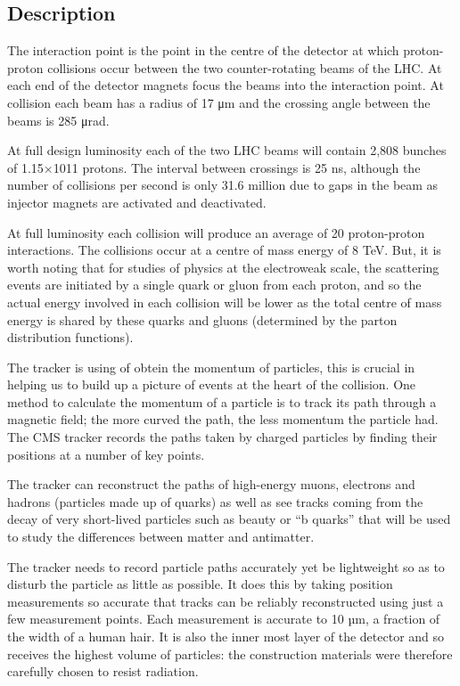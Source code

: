 \subsection{Description}

The interaction point is the point in the centre of the detector at which proton-proton collisions occur between the two counter-rotating beams of the LHC. At each end of the detector magnets focus the beams into the interaction point. At collision each beam has a radius of 17 μm and the crossing angle between the beams is 285 μrad.

At full design luminosity each of the two LHC beams will contain 2,808 bunches of 1.15×1011 protons. The interval between crossings is 25 ns, although the number of collisions per second is only 31.6 million due to gaps in the beam as injector magnets are activated and deactivated.

At full luminosity each collision will produce an average of 20 proton-proton interactions. The collisions occur at a centre of mass energy of 8 TeV. But, it is worth noting that for studies of physics at the electroweak scale, the scattering events are initiated by a single quark or gluon from each proton, and so the actual energy involved in each collision will be lower as the total centre of mass energy is shared by these quarks and gluons (determined by the parton distribution functions).

The tracker is using of obtein the momentum of particles, this is crucial in helping us to build up a picture of events at the heart of the collision. One method to calculate the momentum of a particle is to track its path through a magnetic field; the more curved the path, the less momentum the particle had. The CMS tracker records the paths taken by charged particles by finding their positions at a number of key points.

The tracker can reconstruct the paths of high-energy muons, electrons and hadrons (particles made up of quarks) as well as see tracks coming from the decay of very short-lived particles such as beauty or “b quarks” that will be used to study the differences between matter and antimatter.

The tracker needs to record particle paths accurately yet be lightweight so as to disturb the particle as little as possible. It does this by taking position measurements so accurate that tracks can be reliably reconstructed using just a few measurement points. Each measurement is accurate to 10 µm, a fraction of the width of a human hair. It is also the inner most layer of the detector and so receives the highest volume of particles: the construction materials were therefore carefully chosen to resist radiation.

